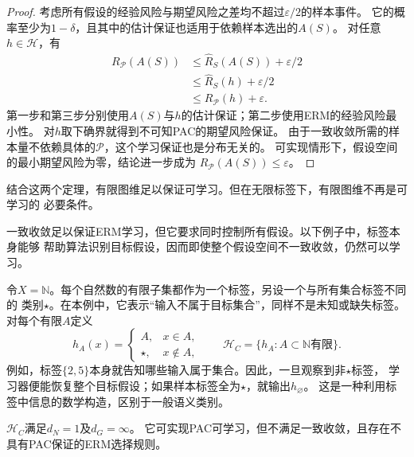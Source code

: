 \begin{proof}
考虑所有假设的经验风险与期望风险之差均不超过$\varepsilon/2$的样本事件。
它的概率至少为$1-\delta$，且其中的估计保证也适用于依赖样本选出的$A(S)$。
对任意$h\in\mathcal H$，有
\begin{align*}
 R_{\mathcal P}(A(S))
 &\leq\hat R_S(A(S))+\varepsilon/2\\
 &\leq\hat R_S(h)+\varepsilon/2\\
 &\leq R_{\mathcal P}(h)+\varepsilon.
\end{align*}
第一步和第三步分别使用$A(S)$与$h$的估计保证；第二步使用ERM的经验风险最小性。
对$h$取下确界就得到不可知PAC的期望风险保证。
由于一致收敛所需的样本量不依赖具体的$\mathcal P$，这个学习保证也是分布无关的。
可实现情形下，假设空间的最小期望风险为零，结论进一步成为
$R_{\mathcal P}(A(S))\leq\varepsilon$。
\end{proof}

结合这两个定理，有限图维足以保证可学习。但在无限标签下，有限图维不再是可学习的
必要条件。

一致收敛足以保证ERM学习，但它要求同时控制所有假设。以下例子中，标签本身能够
帮助算法识别目标假设，因而即使整个假设空间不一致收敛，仍然可以学习。

\label{ex:multiclass-cantor}

令$X=\mathbb N$。每个自然数的有限子集都作为一个标签，另设一个与所有集合标签不同的
类别$\star$。在本例中，它表示“输入不属于目标集合”，同样不是未知或缺失标签。
对每个有限$A$定义
\begin{equation}
 h_A(x)=\begin{cases}A,&x\in A,\\\star,&x\notin A,\end{cases}
 \qquad\mathcal H_C=\{h_A:A\subset\mathbb N\text{有限}\}.
 \label{eq:cantor-class}
\end{equation}
例如，标签$\{2,5\}$本身就告知哪些输入属于集合。因此，一旦观察到非$\star$标签，
学习器便能恢复整个目标假设；如果样本标签全为$\star$，就输出$h_{\varnothing}$。
这是一种利用标签中信息的数学构造，区别于一般语义类别。

\begin{theorem}[可学习性不推出一致收敛]
\label{thm:multiclass-erm-separation}
$\mathcal H_C$满足$d_N=1$及$d_G=\infty$。
它可实现PAC可学习，但不满足一致收敛，且存在不具有PAC保证的ERM选择规则。
\end{theorem}

